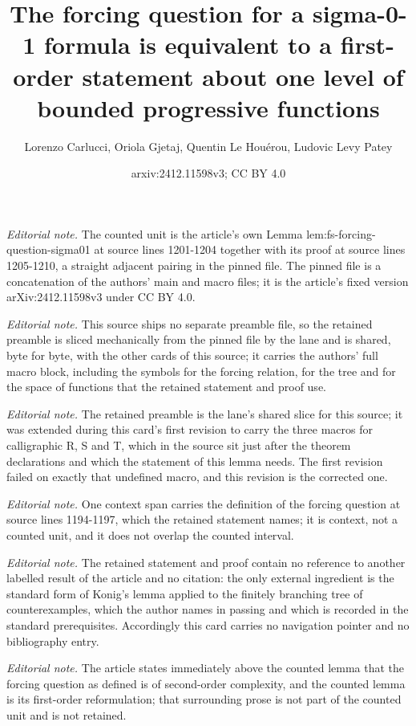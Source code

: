 \documentclass{article}
\title{The forcing question for a sigma-0-1 formula is equivalent to a first-order statement about one level of bounded progressive functions}
\author{Lorenzo Carlucci, Oriola Gjetaj, Quentin Le Houérou, Ludovic Levy Patey}
\date{arxiv:2412.11598v3; CC BY 4.0}
\begin{document}
\maketitle
\noindent\textit{Editorial note.} The counted unit is the article's own Lemma lem:fs-forcing-question-sigma01 at source lines 1201-1204 together with its proof at source lines 1205-1210, a straight adjacent pairing in the pinned file. The pinned file is a concatenation of the authors' main and macro files; it is the article's fixed version arXiv:2412.11598v3 under CC BY 4.0.\par\medskip
\noindent\textit{Editorial note.} This source ships no separate preamble file, so the retained preamble is sliced mechanically from the pinned file by the lane and is shared, byte for byte, with the other cards of this source; it carries the authors' full macro block, including the symbols for the forcing relation, for the tree and for the space of functions that the retained statement and proof use.\par\medskip
\noindent\textit{Editorial note.}  The retained preamble is the lane's shared slice for this source; it was extended during this card's first revision to carry the three macros for calligraphic R, S and T, which in the source sit just after the theorem declarations and which the statement of this lemma needs. The first revision failed on exactly that undefined macro, and this revision is the corrected one.\par\medskip
\noindent\textit{Editorial note.} One context span carries the definition of the forcing question at source lines 1194-1197, which the retained statement names; it is context, not a counted unit, and it does not overlap the counted interval.\par\medskip
\noindent\textit{Editorial note.} The retained statement and proof contain no reference to another labelled result of the article and no citation: the only external ingredient is the standard form of Konig's lemma applied to the finitely branching tree of counterexamples, which the author names in passing and which is recorded in the standard prerequisites. Accordingly this card carries no navigation pointer and no bibliography entry.\par\medskip
\noindent\textit{Editorial note.} The article states immediately above the counted lemma that the forcing question as defined is of second-order complexity, and the counted lemma is its first-order reformulation; that surrounding prose is not part of the counted unit and is not retained.\par\medskip
\end{document}

